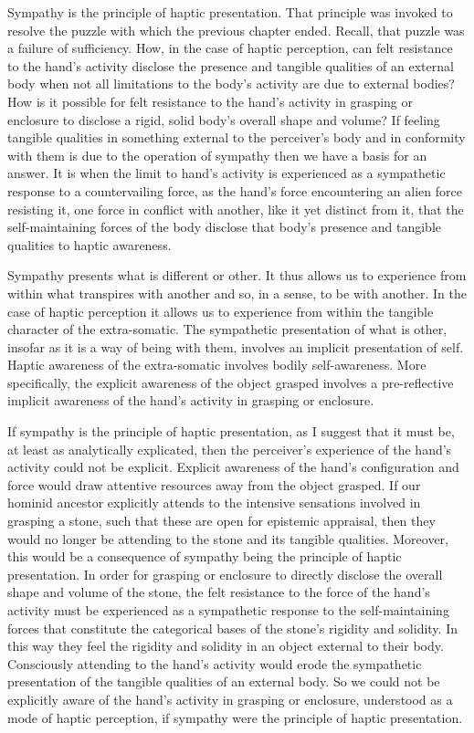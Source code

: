 Sympathy is the principle of haptic presentation. That principle was invoked to resolve the puzzle with which the previous chapter ended. Recall, that puzzle was a failure of sufficiency. How, in the case of haptic perception, can felt resistance to the hand's activity disclose the presence and tangible qualities of an external body when not all limitations to the body's activity are due to external bodies? How is it possible for felt resistance to the hand’s activity in grasping or enclosure to disclose a rigid, solid body’s overall shape and volume? If feeling tangible qualities in something external to the perceiver’s body and in conformity with them is due to the operation of sympathy then we have a basis for an answer. It is when the limit to hand’s activity is experienced as a sympathetic response to a countervailing force, as the hand’s force encountering an alien force resisting it, one force in conflict with another, like it yet distinct from it, that the self-maintaining forces of the body disclose that body’s presence and tangible qualities to haptic awareness.

Sympathy presents what is different or other. It thus allows us to experience from within what transpires with another and so, in a sense, to be with another. In the case of haptic perception it allows us to experience from within the tangible character of the extra-somatic. The sympathetic presentation of what is other, insofar as it is a way of being with them, involves an implicit presentation of self. Haptic awareness of the extra-somatic involves bodily self-awareness. More specifically, the explicit awareness of the object grasped involves a pre-reflective implicit awareness of the hand's activity in grasping or enclosure.

If sympathy is the principle of haptic presentation, as I suggest that it must be, at least as analytically explicated, then the perceiver's experience of the hand's activity could not be explicit. Explicit awareness of the hand's configuration and force would draw attentive resources away from the object grasped. If our hominid ancestor explicitly attends to the intensive sensations involved in grasping a stone, such that these are open for epistemic appraisal, then they would no longer be attending to the stone and its tangible qualities. Moreover, this would be a consequence of sympathy being the principle of haptic presentation. In order for grasping or enclosure to directly disclose the overall shape and volume of the stone, the felt resistance to the force of the hand's activity must be experienced as a sympathetic response to the self-maintaining forces that constitute the categorical bases of the stone's rigidity and solidity. In this way they feel the rigidity and solidity in an object external to their body. Consciously attending to the hand's activity would erode the sympathetic presentation of the tangible qualities of an external body. So we could not be explicitly aware of the hand's activity in grasping or enclosure, understood as a mode of haptic perception, if sympathy were the principle of haptic presentation.

